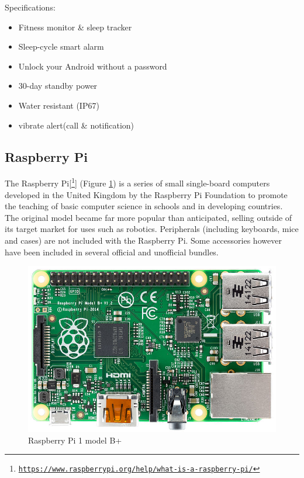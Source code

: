 Specifications:
\begin{itemize}
	\item Fitness monitor \& sleep tracker
	\item Sleep-cycle smart alarm
	\item Unlock your Android without a password
	\item 30-day standby power
	\item Water resistant (IP67)
	\item vibrate alert(call \& notification)
\end{itemize}

\subsection{Raspberry Pi}

The Raspberry Pi[\footnote{\href{https://www.raspberrypi.org/help/what-is-a-raspberry-pi/}{\texttt{https://www.raspberrypi.org/help/what-is-a-raspberry-pi/}}}] (Figure \ref{fig:raspberry})  is a series of small single-board computers developed in the United Kingdom by the Raspberry Pi Foundation to promote the teaching of basic computer science in schools and in developing countries. The original model became far more popular than anticipated, selling outside of its target market for uses such as robotics. Peripherals (including keyboards, mice and cases) are not included with the Raspberry Pi. Some accessories however have been included in several official and unofficial bundles.
\begin{figure}[h]
	\centering
	\includegraphics[width=0.5\linewidth]{images/raspberrypi.jpg}
	\caption{Raspberry Pi 1 model B+}
	\label{fig:raspberry}
\end{figure}
